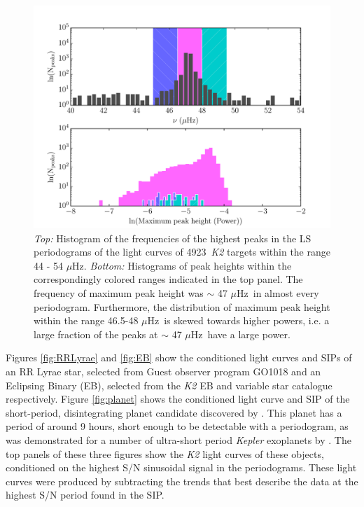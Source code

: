 \documentclass[useAMS, usenatbib, preprint, 12pt]{aastex}
\newcommand{\nGO}{4923}
\newcommand{\uHz}{$\mu$Hz}
\begin{document}
\begin{figure}[h]
\begin{center}
\includegraphics[width=6in, clip=true]{vbg_hist.pdf}
\caption{{\it Top:} Histogram of the frequencies of the highest peaks in the
	LS periodograms of the \citet{Vanderburg2014} light curves of \nGO\
	{\it K2} targets within the range 44 - 54 \uHz.
	{\it Bottom:} Histograms of peak heights within the correspondingly
	colored ranges indicated in the top panel.
	The frequency of maximum peak height was $\sim$ 47 \uHz\ in almost
	every periodogram.
	Furthermore, the distribution of maximum peak height within the range
	46.5-48 \uHz\ is skewed towards higher powers, i.e. a large fraction of
	the peaks at $\sim$ 47 \uHz\ have a large power.
}
\label{fig:vbg_hist}
\end{center}
\end{figure}

Figures \ref{fig:RRLyrae} and \ref{fig:EB} show the conditioned light curves
and SIPs of an RR Lyrae star, selected from Guest observer program GO1018 and
an Eclipsing Binary (EB), selected from the \citet{Armstrong2015} {\it K2} EB
and variable star catalogue respectively.
Figure \ref{fig:planet} shows the conditioned light curve and SIP of the
short-period, disintegrating planet candidate discovered by
\citet{Sanchis-Ojeda2015}.
This planet has a period of around 9 hours, short enough to be detectable
with a periodogram, as was demonstrated for a number of ultra-short
period {\it Kepler} exoplanets by \citet{Sanchis-Ojeda2014}.
The top panels of these three figures show the {\it K2} light curves of these
objects, conditioned on the highest S/N sinusoidal signal in the
periodograms.
These light curves were produced by subtracting the trends that best describe
the data at the highest S/N period found in the SIP.
\end{document}
